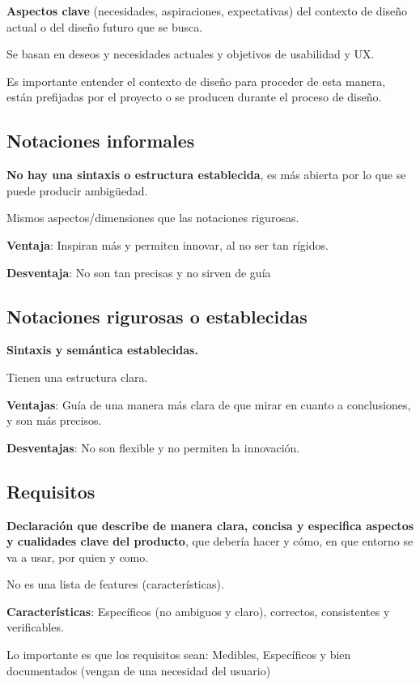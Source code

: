 \documentclass[12pt, twoside, openright]{report} %
\begin{document}
\textbf{Aspectos clave} (necesidades, aspiraciones, expectativas) del
contexto de diseño actual o del diseño futuro que se busca.

Se basan en deseos y necesidades actuales y objetivos de usabilidad y
UX.

Es importante entender el contexto de diseño para proceder de esta
manera, están prefijadas por el proyecto o se producen durante el
proceso de diseño.

\subsection{Notaciones informales}

\textbf{No hay una sintaxis o estructura establecida}, es más abierta
por lo que se puede producir ambigüedad.

Mismos aspectos/dimensiones que las notaciones rigurosas.

\textbf{Ventaja}: Inspiran más y permiten innovar, al no ser tan
rígidos.

\textbf{Desventaja}: No son tan precisas y no sirven de guía

\subsection{Notaciones rigurosas o establecidas}

\textbf{Sintaxis y semántica establecidas.}

Tienen una estructura clara.

\textbf{Ventajas}: Guía de una manera más clara de que mirar en cuanto a
conclusiones, y son más precisos.

\textbf{Desventajas}: No son flexible y no permiten la innovación.

\subsection{Requisitos}

\textbf{Declaración que describe de manera clara, concisa y especifica
aspectos y cualidades clave del producto}, que debería hacer y cómo, en
que entorno se va a usar, por quien y como.

No es una lista de features (características).

\textbf{Características}: Específicos (no ambiguos y claro), correctos,
consistentes y verificables.

Lo importante es que los requisitos sean: Medibles, Específicos y bien documentados (vengan de una necesidad del usuario)
\end{document}
